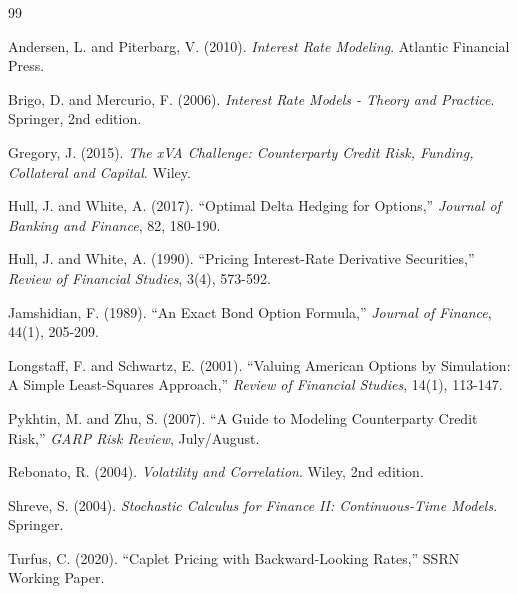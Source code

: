 \documentclass[11pt,a4paper]{article}
\theoremstyle{definition}
\begin{document}
\begin{thebibliography}{99}

Andersen, L. and Piterbarg, V. (2010). \textit{Interest Rate Modeling}. Atlantic Financial Press.

Brigo, D. and Mercurio, F. (2006). \textit{Interest Rate Models - Theory and Practice}. Springer, 2nd edition.

Gregory, J. (2015). \textit{The xVA Challenge: Counterparty Credit Risk, Funding, Collateral and Capital}. Wiley.

Hull, J. and White, A. (2017). ``Optimal Delta Hedging for Options,'' \textit{Journal of Banking and Finance}, 82, 180-190.

Hull, J. and White, A. (1990). ``Pricing Interest-Rate Derivative Securities,'' \textit{Review of Financial Studies}, 3(4), 573-592.

Jamshidian, F. (1989). ``An Exact Bond Option Formula,'' \textit{Journal of Finance}, 44(1), 205-209.

Longstaff, F. and Schwartz, E. (2001). ``Valuing American Options by Simulation: A Simple Least-Squares Approach,'' \textit{Review of Financial Studies}, 14(1), 113-147.

Pykhtin, M. and Zhu, S. (2007). ``A Guide to Modeling Counterparty Credit Risk,'' \textit{GARP Risk Review}, July/August.

Rebonato, R. (2004). \textit{Volatility and Correlation}. Wiley, 2nd edition.

Shreve, S. (2004). \textit{Stochastic Calculus for Finance II: Continuous-Time Models}. Springer.

Turfus, C. (2020). ``Caplet Pricing with Backward-Looking Rates,'' SSRN Working Paper.

\end{thebibliography}
\end{document}
